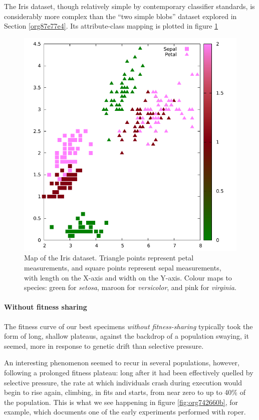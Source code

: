 \documentclass[12pt,glossary]{dalthesis}
\begin{document}
The Iris dataset, though relatively simple by contemporary classifier standards, 
is considerably more complex than the ``two simple blobs'' dataset explored in
Section \ref{org87e77e4}. Its attribute-class mapping is plotted
in figure \ref{fig:org2b4d175}

\begin{figure}[htbp]
\centering
\includegraphics[width=.9\linewidth]{../images/plots/iris_plot.pdf}
\caption{\label{fig:org2b4d175}
Map of the Iris dataset. Triangle points represent petal measurements, and square points represent sepal measurements, with length on the X-axis and width on the Y-axis. Colour maps to species: green for \emph{setosa}, maroon for \emph{versicolor}, and pink for \emph{virginia}.}
\end{figure}


\paragraph{Without fitness sharing}
\label{sec:org6e19893}

The fitness curve of our best specimens \emph{without fitness-sharing} typically took
the form of long, shallow plateaus, against the backdrop of a population swaying,
it seemed, more in response to genetic drift than selective pressure.

An interesting phenomenon seemed to recur in several populations, however, following
a prolonged fitness plateau: long after it had been effectively quelled by selective
pressure, the rate at which individuals crash during execution would begin to rise
again, climbing, in fits and starts, from near zero to up to 40\% of the population.
This is what we see happening in figure \ref{fig:org742660b}, for example,
which documents one of the early experiments performed with \gls{roper}.
\end{document}
